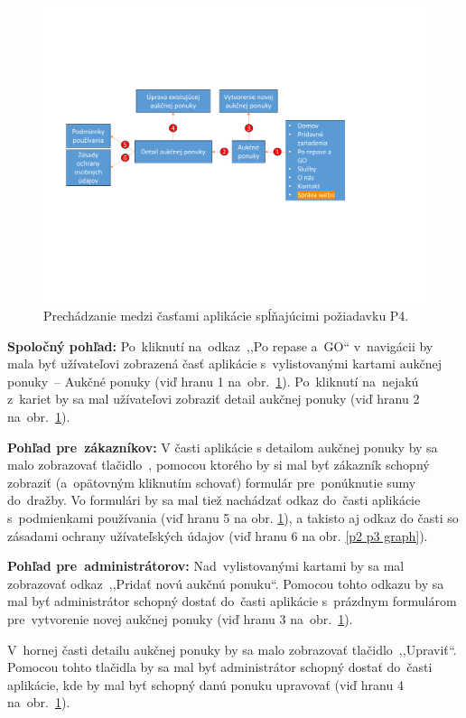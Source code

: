 \begin{figure}[H]\centering
\includegraphics[width=140mm]{../img/UI concept/p4 graph}
\caption{Prechádzanie medzi časťami aplikácie spĺňajúcimi požiadavku P4.}
\label{p4 graph}
\end{figure}

\textbf{Spoločný pohľad:} Po~kliknutí na~odkaz~,,Po repase a~GO`` v~navigácii by mala byť užívateľovi zobrazená časť aplikácie s~vylistovanými kartami aukčnej ponuky~-- Aukčné ponuky (viď hranu 1 na~obr.~\ref{p4 graph}). Po~kliknutí na~nejakú z~kariet by sa mal užívateľovi zobraziť detail aukčnej ponuky (viď hranu 2 na~obr.~\ref{p4 graph}). 

\textbf{Pohľad pre~zákazníkov:} V časti aplikácie s detailom aukčnej ponuky by sa malo zobrazovať tlačidlo~, pomocou ktorého by si mal byť zákazník schopný zobraziť (a~opätovným kliknutím schovať) formulár pre~ponúknutie sumy do~dražby. Vo formulári by sa mal tiež nachádzať odkaz do~časti aplikácie s~podmienkami používania (viď hranu 5 na obr. \ref{p4 graph}), a takisto aj odkaz do časti so zásadami ochrany užívateľských údajov (viď hranu 6 na obr. \ref{p2 p3 graph}).

\textbf{Pohľad pre~administrátorov:} Nad~vylistovanými kartami by sa mal zobrazovať odkaz~,,Pridať novú aukčnú ponuku``. Pomocou tohto odkazu by sa mal byť administrátor schopný dostať do~časti aplikácie s~prázdnym formulárom pre~vytvorenie novej aukčnej ponuky (viď hranu 3 na~obr.~\ref{p4 graph}).

V~hornej časti detailu aukčnej ponuky by sa malo zobrazovať tlačidlo~,,Upraviť``. Pomocou tohto tlačidla by sa mal byť administrátor schopný dostať do~časti aplikácie, kde by mal byť schopný danú ponuku upravovať (viď hranu 4 na~obr.~\ref{p4 graph}).

